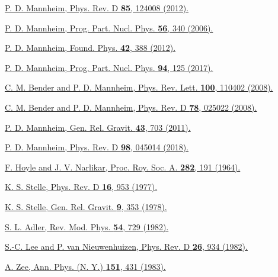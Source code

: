 \documentclass[aps]{revtex4}
\begin{document}
\begin{thebibliography}{99}


  \href{https://doi.org/10.1103/PhysRevD.85.124008}{P. D. Mannheim, Phys. Rev. D {\bf 85}, 124008 (2012).}

 \href{https://doi.org/10.1016/j.ppnp.2005.08.001}{P. D. Mannheim, Prog. Part. Nucl. Phys. {\bf 56}, 340 (2006). }

 \href{https://doi.org/10.1007/s10701-011-9608-6}{P. D. Mannheim, Found. Phys. {\bf 42}, 388 (2012).}

  \href{https://doi.org/10.1016/j.ppnp.2017.02.001}{P. D. Mannheim, Prog. Part. Nucl. Phys. {\bf 94}, 125 (2017).}

 \href{https://doi.org/10.1103/PhysRevLett.100.110402}{C. M. Bender and P. D. Mannheim, Phys. Rev. Lett. {\bf 100}, 110402 (2008).}


 \href{https://doi.org/10.1103/PhysRevD.78.025022}{C. M. Bender and P. D. Mannheim, Phys. Rev. D {\bf 78}, 025022 (2008).}

 \href{https://doi.org/10.1007/s10714-010-1088-z}{P. D. Mannheim, Gen. Rel. Gravit. {\bf 43}, 703 (2011).}

 \href{https://doi.org/10.1103/PhysRevD.98.045014}{P. D. Mannheim, Phys. Rev. D {\bf 98}, 045014 (2018).}



  \href{https://doi.org/10.1098/rspa.1964.0227}{F. Hoyle and J. V. Narlikar, Proc. Roy. Soc. A. {\bf 282}, 191 (1964).}
 
  \href{https://doi.org/10.1103/PhysRevD.16.953}{K. S. Stelle, Phys. Rev. D {\bf 16}, 953 (1977).}
 
  \href{https://doi.org/10.1007/BF00760427}{K. S. Stelle, Gen. Rel. Gravit. {\bf 9}, 353 (1978).}
 
  \href{https://doi.org/10.1103/RevModPhys.54.729}{S. L. Adler, Rev. Mod. Phys. {\bf 54}, 729 (1982).}
 
  \href{https://doi.org/10.1103/PhysRevD.26.934}{S.-C. Lee and P. van Nieuwenhuizen, Phys. Rev. D {\bf 26}, 934 (1982).}
 
   \href{https://doi.org/10.1016/0003-4916(83)90286-5}{A. Zee, Ann. Phys. (N. Y.) {\bf 151}, 431 (1983).}
  


\end{thebibliography}
\end{document}
